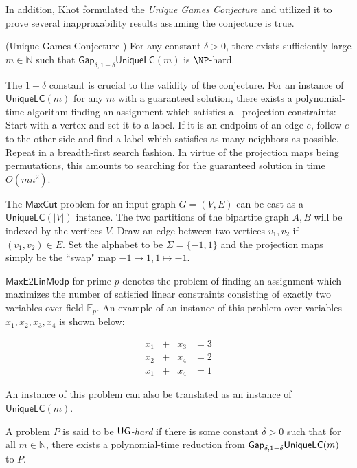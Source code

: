 In addition, Khot formulated the \emph{Unique Games Conjecture} and utilized it to prove several inapproxability results assuming the conjecture is true.

\begin{conjecture} (Unique Games Conjecture \cite{khot2002power})
  For any constant $\delta > 0$, there exists sufficiently large $m \in \mathbb{N}$ such that $\mathsf{Gap}_{\delta,1-\delta}\mathsf{UniqueLC}(m)$ is $\NP$-hard.
\end{conjecture}

\begin{remark}
  The $1-\delta$ constant is crucial to the validity of the conjecture. For an instance of $\mathsf{UniqueLC}(m)$ for any $m$ with a guaranteed solution, there exists a polynomial-time algorithm finding an assignment which satisfies all projection constraints: Start with a vertex and set it to a label. If it is an endpoint of an edge $e$, follow $e$ to the other side and find a label which satisfies as many neighbors as possible. Repeat in a breadth-first search fashion. In virtue of the projection maps being permutations, this amounts to searching for the guaranteed solution in time $O(mn^2)$.
\end{remark}

\begin{example}
  The $\mathsf{MaxCut}$ problem for an input graph $G = (V,E)$ can be cast as a $\mathsf{UniqueLC}(|V|)$ instance. The two partitions of the bipartite graph $A,B$ will be indexed by the vertices $V$. Draw an edge between two vertices $v_1,v_2$ if $(v_1,v_2) \in E$. Set the alphabet to be $\Sigma =\{-1,1\}$ and the projection maps simply be the ``swap" map $-1 \mapsto 1, 1 \mapsto -1$.
\end{example}

\begin{example}
  $\mathsf{MaxE2LinModp}$ for prime $p$ denotes the problem of finding an assignment which maximizes the number of satisfied linear constraints consisting of exactly two variables over field $\mathbb{F}_p$. An example of an instance of this problem over variables $x_1,x_2,x_3,x_4$ is shown below:

  \begin{equation*}
    \begin{alignedat}{3}
      x_1 & +{} & x_3 & = 3 \\
      x_2 & +{}  & x_4 & = 2 \\
      x_1 & +{} & x_4 & = 1
    \end{alignedat}
  \end{equation*}

  An instance of this problem can also be translated as an instance of $\mathsf{UniqueLC}(m)$.
\end{example}

\begin{definition}
  A problem $P$ is said to be \emph{$\mathsf{UG}$-hard} if there is some constant $\delta > 0$ such that for all $m \in \mathbb{N}$, there exists a polynomial-time reduction from $\mathsf{Gap}_{\delta, 1-\delta}\mathsf{UniqueLC}(m)$ to $P$.
\end{definition}


